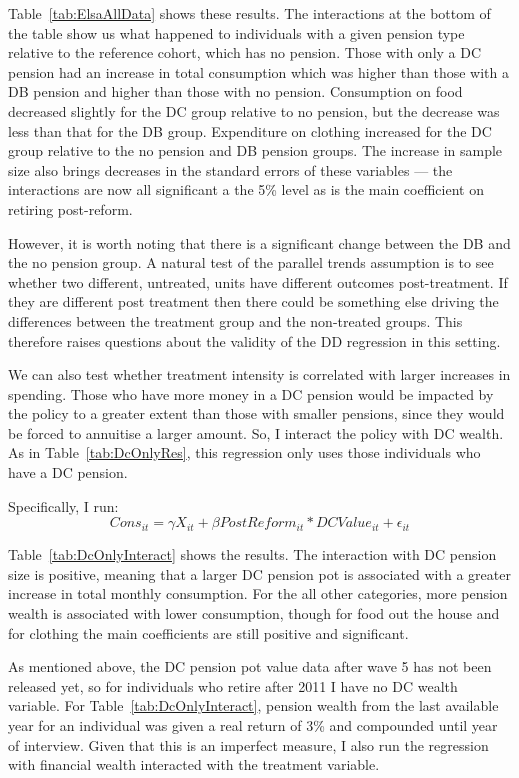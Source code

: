 \documentclass[12pt]{article}
\begin{document}
Table~\ref{tab:ElsaAllData} shows these results. The interactions at the bottom
of the table show us what happened to individuals with a given pension type
relative to the reference cohort, which has no pension. Those with only a DC
pension had an increase in total consumption which was higher than those with a
DB pension and higher than those with no pension. Consumption on food decreased
slightly for the DC group relative to no pension, but the decrease was less than
that for the DB group. Expenditure on clothing increased for the DC group
relative to the no pension and DB pension groups. The increase in sample size
also brings decreases in the standard errors of these variables --- the
interactions are now all significant a the 5\% level as is the main coefficient
on retiring post-reform.

However, it is worth noting that there is a significant change between the DB
and the no pension group. A natural test of the parallel trends assumption is to
see whether two different, untreated, units have different outcomes
post-treatment. If they are different post treatment then there could be
something else driving the differences between the treatment group and the
non-treated groups. This therefore raises questions about the validity of the DD
regression in this setting.

We can also test whether treatment intensity is correlated with larger increases
in spending. Those who have more money in a DC pension would be impacted by the
policy to a greater extent than those with smaller pensions, since they would be
forced to annuitise a larger amount. So, I interact the policy with DC wealth.
As in Table~\ref{tab:DcOnlyRes}, this regression only uses those individuals who
have a DC pension.

Specifically, I run:
\begin{equation*}
  Cons_{it} =  \gamma X_{it} + \beta PostReform_{it}*DCValue_{it} + \epsilon_{it}
\end{equation*}

Table~\ref{tab:DcOnlyInteract} shows the results. The interaction with DC
pension size is positive, meaning that a larger DC pension pot is associated with a
greater increase in total monthly consumption. For the all other categories,
more pension wealth is associated with lower consumption, though for food out
the house and for clothing the main coefficients are still positive and
significant.

As mentioned above, the DC pension pot value data after
wave 5 has not been released yet, so for individuals who retire after 2011 I
have no DC wealth variable. For Table~\ref{tab:DcOnlyInteract}, pension wealth
from the last available year for an individual was given a real return of 3\%
and compounded until year of interview. Given that this is an imperfect measure,
I also run the regression with financial wealth interacted with the treatment
variable.
\end{document}

